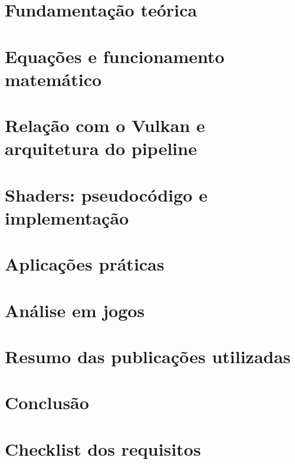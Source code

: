\documentclass[12pt,a4paper]{report}
\begin{document}
\chapter{Fundamentação teórica}
\label{chap:fundamentacao}


\chapter{Equações e funcionamento matemático}
\label{chap:equacoes}


\chapter{Relação com o Vulkan e arquitetura do pipeline}
\label{chap:vulkan}


\chapter{Shaders: pseudocódigo e implementação}
\label{chap:shaders}


\chapter{Aplicações práticas}
\label{chap:aplicacoes}


\chapter{Análise em jogos}
\label{chap:jogos}


\chapter{Resumo das publicações utilizadas}
\label{chap:resumos}


\chapter{Conclusão}
\label{chap:conclusao}



\printbibliography[heading=bibintoc,title={Referências}]

\appendix

\chapter{Checklist dos requisitos}
\end{document}
